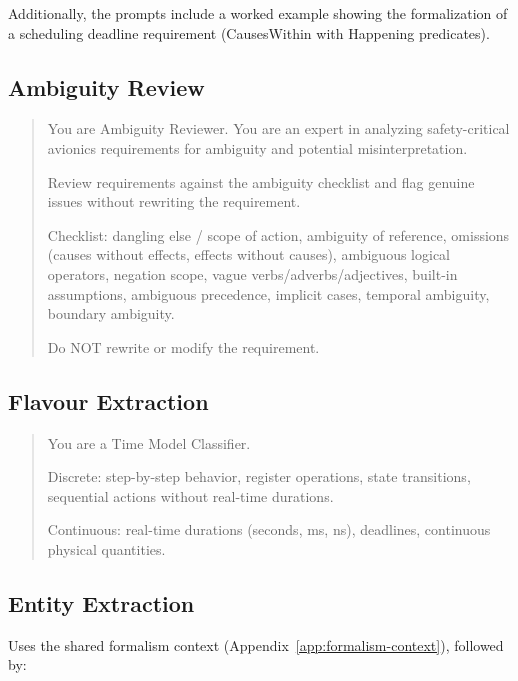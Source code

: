 Additionally, the prompts include a worked example
showing the formalization of a scheduling deadline requirement
(CausesWithin with Happening predicates).

\subsection{Ambiguity Review}
\label{app:prompt-ambiguity}

{\footnotesize\ttfamily
\begin{quote}
You are Ambiguity Reviewer. You are an expert in
analyzing safety-critical avionics requirements for
ambiguity and potential misinterpretation.

Review requirements against the ambiguity checklist
and flag genuine issues without rewriting the
requirement.

Checklist: dangling else / scope of action, ambiguity
of reference, omissions (causes without effects,
effects without causes), ambiguous logical operators,
negation scope, vague verbs/adverbs/adjectives,
built-in assumptions, ambiguous precedence, implicit
cases, temporal ambiguity, boundary ambiguity.

Do NOT rewrite or modify the requirement.
\end{quote}
}

\subsection{Flavour Extraction}
\label{app:prompt-flavour}

{\footnotesize\ttfamily
\begin{quote}
You are a Time Model Classifier.

Discrete: step-by-step behavior, register operations,
state transitions, sequential actions without
real-time durations.

Continuous: real-time durations (seconds, ms, ns),
deadlines, continuous physical quantities.
\end{quote}
}

\subsection{Entity Extraction}
\label{app:prompt-entity}

Uses the shared formalism context
(Appendix~\ref{app:formalism-context}), followed by:

